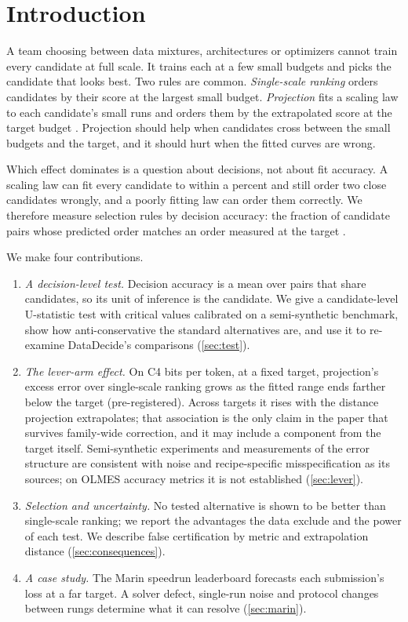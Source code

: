 \documentclass{article}
\begin{document}
\section{Introduction}
\label{sec:intro}

A team choosing between data mixtures, architectures or optimizers cannot
train every candidate at full scale. It trains each at a few small budgets and
picks the candidate that looks best. Two rules are common. \emph{Single-scale
ranking} orders candidates by their score at the largest small budget.
\emph{Projection} fits a scaling law to each candidate's small runs and orders
them by the extrapolated score at the target budget
\citep{kaplan2020scaling,hoffmann2022training}. Projection should help when
candidates cross between the small budgets and the target, and it should hurt
when the fitted curves are wrong.

Which effect dominates is a question about decisions, not about fit
accuracy. A scaling law can fit every candidate to within a percent and still
order two close candidates wrongly, and a poorly fitting law can order them
correctly. We therefore measure selection rules by decision accuracy: the
fraction of candidate pairs whose predicted order matches an order measured at
the target \citep{magnusson2025datadecide,heineman2025signal}.

We make four contributions.  %
\begin{enumerate}
\item \emph{A decision-level test.} Decision accuracy is a mean over pairs that
share candidates, so its unit of inference is the candidate. We give a
candidate-level U-statistic test with critical values calibrated on a
semi-synthetic benchmark, show how anti-conservative the standard alternatives
are, and use it to re-examine DataDecide's comparisons (\cref{sec:test}).
\item \emph{The lever-arm effect.} On C4 bits per token, at a fixed target,
projection's excess error over single-scale ranking grows as the fitted range
ends farther below the target (pre-registered). Across targets it rises with the
distance projection extrapolates; that association is the only claim in the
paper that survives family-wide correction, and it may include a component from
the target itself. Semi-synthetic experiments and measurements of the error structure are
consistent with noise and recipe-specific misspecification as its sources; on
OLMES accuracy metrics it is not established (\cref{sec:lever}).
\item \emph{Selection and uncertainty.} No tested alternative is shown to be
better than single-scale ranking; we report the advantages the data exclude and
the power of each test. We describe false certification by metric and
extrapolation distance (\cref{sec:consequences}).
\item \emph{A case study.} The Marin speedrun leaderboard forecasts each
submission's loss at a far target. A solver defect, single-run noise and
protocol changes between rungs determine what it can resolve
(\cref{sec:marin}).
\end{enumerate}
\end{document}
